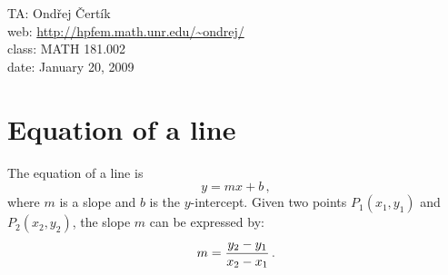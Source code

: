 \documentclass[10pt]{article}
\begin{document}
\noindent TA: Ondřej Čertík\\
web: \url{http://hpfem.math.unr.edu/~ondrej/}\\
class: MATH 181.002\\
date: January 20, 2009

\section{Equation of a line}

The equation of a line is
$$y=mx+b\,,$$
where $m$ is a slope and $b$ is the $y$-intercept. Given two points $P_1(x_1,
y_1)$ and $P_2(x_2, y_2)$, the slope $m$ can be expressed by:
$$m={y_2-y_1\over x_2-x_1}\,.$$
\end{document}
